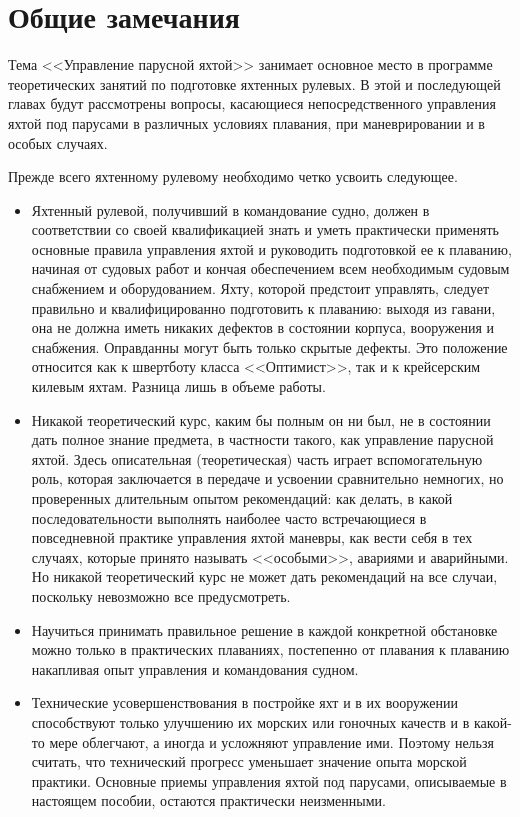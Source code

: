 \documentclass[a4paper, 12pt, twoside, final]{scrbook}
\begin{document}
\section{Общие замечания}

Тема <<Управление парусной яхтой>> занимает основное место в программе теоретических занятий по подготовке яхтенных рулевых. В этой и последующей главах будут рассмотрены вопросы, касающиеся непосредственного управления яхтой под парусами в различных условиях плавания, при маневрировании и в особых случаях.

Прежде всего яхтенному рулевому необходимо четко усвоить следующее.

\begin{itemize}
\item Яхтенный рулевой, получивший в командование судно, должен в соответствии со своей квалификацией знать и уметь практически применять основные правила управления яхтой и руководить подготовкой ее к плаванию, начиная от судовых работ и кончая обеспечением всем необходимым судовым снабжением и оборудованием. Яхту, которой предстоит управлять, следует правильно и квалифицированно подготовить к плаванию: выходя из гавани, она не должна иметь никаких дефектов в состоянии корпуса, вооружения и снабжения. Оправданны могут быть только скрытые дефекты. Это положение относится как к швертботу класса <<Оптимист>>, так и к крейсерским килевым яхтам. Разница лишь в объеме работы.
\item Никакой теоретический курс, каким бы полным он ни был, не в состоянии дать полное знание предмета, в частности такого, как управление парусной яхтой. Здесь описательная (теоретическая) часть играет вспомогательную роль, которая заключается в передаче и усвоении сравнительно немногих, но проверенных длительным опытом рекомендаций: как делать, в какой последовательности выполнять наиболее часто встречающиеся в повседневной практике управления яхтой маневры, как вести себя в тех случаях, которые принято называть <<особыми>>, авариями и аварийными. Но никакой теоретический курс не может дать рекомендаций на все случаи, поскольку невозможно все предусмотреть.
\item Научиться принимать правильное решение в каждой конкретной обстановке можно только в практических плаваниях, постепенно от плавания к плаванию накапливая опыт управления и командования судном.
\item Технические усовершенствования в постройке яхт и в их вооружении способствуют только улучшению их морских или гоночных качеств и в какой-то мере облегчают, а иногда и усложняют управление ими. Поэтому нельзя считать, что технический прогресс уменьшает значение опыта морской практики. Основные приемы управления яхтой под парусами, описываемые в настоящем пособии, остаются практически неизменными.

\end{itemize}
\end{document}
